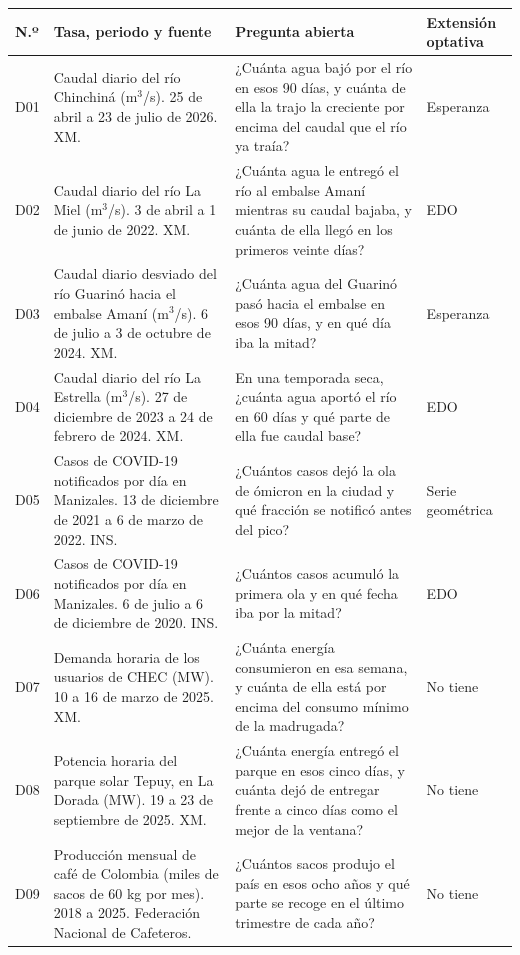 \documentclass[12pt,letterpaper]{article}
\renewcommand{\arraystretch}{1.25}
\begin{document}
{\footnotesize
\renewcommand{\arraystretch}{1.2}
\begin{longtable}{L{0.7cm}L{4.1cm}L{7.3cm}L{2.6cm}}
\toprule
\textbf{N.º} & \textbf{Tasa, periodo y fuente} & \textbf{Pregunta abierta} & \textbf{Extensión optativa}\\
\midrule
\endhead
D01 & Caudal diario del río Chinchiná (m$^3$/s). 25 de abril a 23 de julio de 2026. XM. & ¿Cuánta agua bajó por el río en esos 90 días, y cuánta de ella la trajo la creciente por encima del caudal que el río ya traía? & Esperanza\\
D02 & Caudal diario del río La Miel (m$^3$/s). 3 de abril a 1 de junio de 2022. XM. & ¿Cuánta agua le entregó el río al embalse Amaní mientras su caudal bajaba, y cuánta de ella llegó en los primeros veinte días? & EDO\\
D03 & Caudal diario desviado del río Guarinó hacia el embalse Amaní (m$^3$/s). 6 de julio a 3 de octubre de 2024. XM. & ¿Cuánta agua del Guarinó pasó hacia el embalse en esos 90 días, y en qué día iba la mitad? & Esperanza\\
D04 & Caudal diario del río La Estrella (m$^3$/s). 27 de diciembre de 2023 a 24 de febrero de 2024. XM. & En una temporada seca, ¿cuánta agua aportó el río en 60 días y qué parte de ella fue caudal base? & EDO\\
D05 & Casos de COVID-19 notificados por día en Manizales. 13 de diciembre de 2021 a 6 de marzo de 2022. INS. & ¿Cuántos casos dejó la ola de ómicron en la ciudad y qué fracción se notificó antes del pico? & Serie geométrica\\
D06 & Casos de COVID-19 notificados por día en Manizales. 6 de julio a 6 de diciembre de 2020. INS. & ¿Cuántos casos acumuló la primera ola y en qué fecha iba por la mitad? & EDO\\
D07 & Demanda horaria de los usuarios de CHEC (MW). 10 a 16 de marzo de 2025. XM. & ¿Cuánta energía consumieron en esa semana, y cuánta de ella está por encima del consumo mínimo de la madrugada? & No tiene\\
D08 & Potencia horaria del parque solar Tepuy, en La Dorada (MW). 19 a 23 de septiembre de 2025. XM. & ¿Cuánta energía entregó el parque en esos cinco días, y cuánta dejó de entregar frente a cinco días como el mejor de la ventana? & No tiene\\
D09 & Producción mensual de café de Colombia (miles de sacos de 60 kg por mes). 2018 a 2025. Federación Nacional de Cafeteros. & ¿Cuántos sacos produjo el país en esos ocho años y qué parte se recoge en el último trimestre de cada año? & No tiene\\

\end{longtable}}
\end{document}
